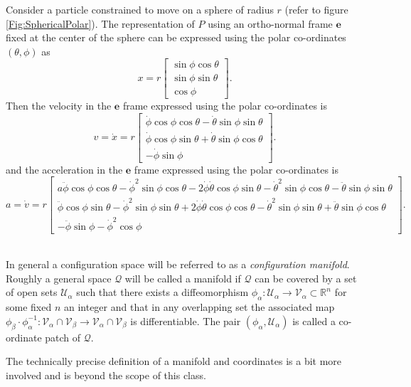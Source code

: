 \documentclass[graybox,envcountchap,sectrefs]{svmonoMuga}
\begin{document}
\begin{example}\label{Example:ParticleOnSphere}
Consider a particle constrained to move on a sphere of radius $r$ (refer to figure \ref{Fig:SphericalPolar}).
The representation of $P$ using an ortho-normal frame $\mathbf{e}$ fixed at the center of the sphere can be expressed using the polar co-ordinates $(\theta,\phi)$ as
\[
x=r\left[ \begin{array}{c} \sin{\phi}\cos{\theta}\\\sin{\phi}\sin{\theta}\\\cos{\phi} \end{array} \right].
\]
Then the velocity in the $\mathbf{e}$ frame expressed using the polar co-ordinates is
\[
v=\dot{x}=r\left[ \begin{array}{c} \dot{\phi}\cos{\phi}\cos{\theta}-\dot{\theta}\sin{\phi}\sin{\theta}\\
\dot{\phi}\cos{\phi}\sin{\theta}+\dot{\theta}\sin{\phi}\cos{\theta}\\-\dot{\phi}\sin{\phi} \end{array} \right].
\]
and the acceleration in the $\mathbf{e}$ frame expressed using the polar co-ordinates is
\[
a=\dot{v}=r\left[ \begin{array}{c}
a\ddot{\phi}\cos{\phi}\cos{\theta}-\dot{\phi}^2\sin{\phi}\cos{\theta}
-2\dot{\phi}\dot{\theta}\cos{\phi}\sin{\theta}-\dot{\theta}^2\sin{\phi}\cos{\theta}-\ddot{\theta}\sin{\phi}\sin{\theta}\\
\ddot{\phi}\cos{\phi}\sin{\theta}-\dot{\phi}^2\sin{\phi}\sin{\theta}
+2\dot{\phi}\dot{\theta}\cos{\phi}\cos{\theta}-\dot{\theta}^2\sin{\phi}\sin{\theta}+\ddot{\theta}\sin{\phi}\cos{\theta}\\
-\ddot{\phi}\sin{\phi}-\dot{\phi}^2\cos{\phi} \end{array} \right].
\]
\\
\end{example}







\begin{svgraybox}
In general a configuration space will be referred to as a \textit{configuration manifold}. Roughly a general space $\mathcal{Q}$ will be called a manifold if $\mathcal{Q}$ can be covered by a set of open sets $\mathcal{U}_\alpha$ such that there exists a diffeomorphism $\phi_\alpha : \mathcal{U}_\alpha \to \mathcal{V}_\alpha\subset \mathbb{R}^n$ for some fixed $n$ an integer and that in any overlapping set the associated map $ \phi_\beta\cdot\phi_\alpha^{-1}: \mathcal{V}_\alpha \cap \mathcal{V}_\beta \to \mathcal{V}_\alpha \cap \mathcal{V}_\beta$ is differentiable.
The pair $(\phi_\alpha,\mathcal{U}_\alpha)$ is called a co-ordinate patch of $\mathcal{Q}$.
\end{svgraybox}
The technically precise definition of a manifold and coordinates is a bit more involved and is beyond the scope of this class.
\end{document}
